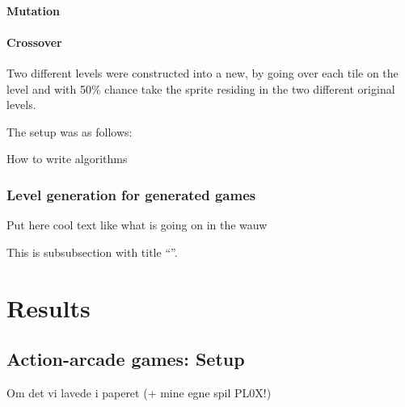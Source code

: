 \documentclass[a4paper,titlepage,final, twoside]{report}
\newenvironment{example}[1]
  {\begin{exa}[frametitle=#1]}
  {\end{exa}}
\begin{document}
\subsubsection*{Mutation} 



\subsubsection*{Crossover} 
Two different levels were constructed into a new, by going over each tile on the level and with 50\% chance take the sprite residing in the two different original levels.


The setup was as follows:
\\

\begin{algorithm}[H]
 \caption{How to write algorithms}
\end{algorithm}



\subsection{Level generation for generated games} 


\begin{example}{The Title}
Put here cool text like what is going on in the wauw
\end{example}
This is subsubsection with title ``\Subsectionname''.


\chapter{Results}

\section{Action-arcade games: Setup}
Om det vi lavede i paperet (+ mine egne spil PL0X!)
\end{document}
